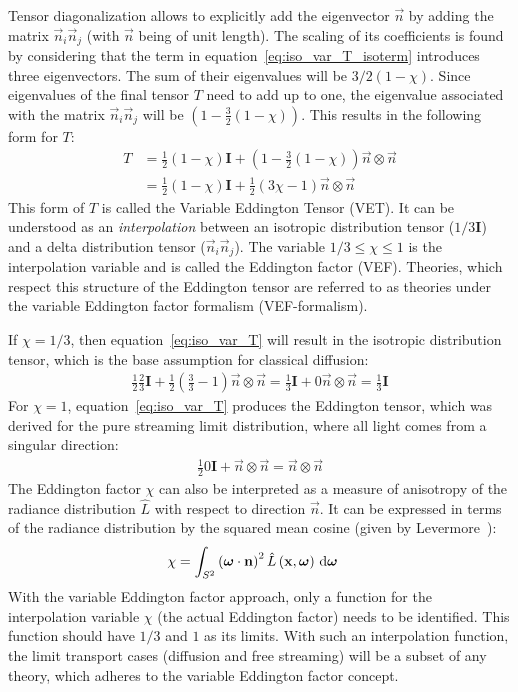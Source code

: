 Tensor diagonalization allows to explicitly add the eigenvector $\vec{n}$ by adding the matrix $\vec{n}_i\vec{n}_j$ (with $\vec{n}$ being of unit length). The scaling of its coefficients is found by considering that the term in equation~\ref{eq:iso_var_T_isoterm} introduces three eigenvectors. The sum of their eigenvalues will be $3/2(1-\chi)$. Since eigenvalues of the final tensor $T$ need to add up to one, the eigenvalue associated with the matrix $\vec{n}_i\vec{n}_j$ will be $\left(1- \frac{3}{2}\left(1 - \chi\right)\right)$. This results in the following form for $T$:
\begin{align}
T &= \frac{1}{2}\left(1-\chi\right)\mathbf{I} + \left(1- \frac{3}{2}\left(1 - \chi\right)\right) \vec{n}\otimes\vec{n}
\nonumber
\\
&= \frac{1}{2}\left(1-\chi\right)\mathbf{I} + \frac{1}{2}\left(3\chi-1\right) \vec{n}\otimes\vec{n}
\label{eq:iso_var_T}
\end{align}
This form of $T$ is called the Variable Eddington Tensor (VET). It can be understood as an \emph{interpolation} between an isotropic distribution tensor ($1/3\mathbf{I}$) and a delta distribution tensor ($\vec{n}_i\vec{n}_j$). The variable $1/3 \le \chi \le 1$ is the interpolation variable and is called the Eddington factor (VEF). Theories, which respect this structure of the Eddington tensor are referred to as theories under the variable Eddington factor formalism (VEF-formalism).

If $\chi=1/3$, then equation~\ref{eq:iso_var_T} will result in the isotropic distribution tensor, which is the base assumption for classical diffusion:
\begin{align}
\frac{1}{2}\frac{2}{3}\mathbf{I} + \frac{1}{2}\left(\frac{3}{3}-1\right) \vec{n}\otimes\vec{n}
=\frac{1}{3}\mathbf{I} + 0\vec{n}\otimes\vec{n} = \frac{1}{3}\mathbf{I}
\end{align}
For $\chi=1$, equation~\ref{eq:iso_var_T} produces the Eddington tensor, which was derived for the pure streaming limit distribution, where all light comes from a singular direction:
\begin{align}
\frac{1}{2}0\mathbf{I} + \vec{n}\otimes\vec{n}
= \vec{n}\otimes\vec{n}
\end{align}
The Eddington factor $\chi$ can also be interpreted as a measure of anisotropy of the radiance distribution $\widehat{L}$ with respect to direction $\vec{n}$. It can be expressed in terms of the radiance distribution by the squared mean cosine (given by Levermore~\cite{Levermore84}):
\begin{align}
\chi &= \int_{S^2}{ \left(\boldsymbol{\mathbf{\omega}}\cdot\boldsymbol{\mathbf{n}}\right)^2\hat{L}\left(\boldsymbol{\mathbf{x}}, \boldsymbol{\mathbf{\omega}}\right)\,\mathrm{d}\boldsymbol{\mathbf{\omega}}}
\label{eq:iso_var_chi}
\end{align}
With the variable Eddington factor approach, only a function for the interpolation variable $\chi$ (the actual Eddington factor) needs to be identified. This function should have $1/3$ and $1$ as its limits. With such an interpolation function, the limit transport cases (diffusion and free streaming) will be a subset of any theory, which adheres to the variable Eddington factor concept.

